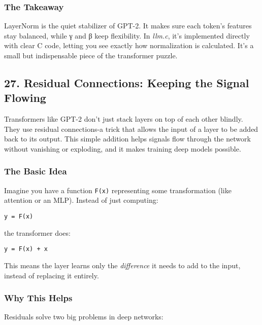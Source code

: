 \documentclass[
  letterpaper,
  DIV=11,
  numbers=noendperiod]{scrreprt}
\begin{document}
\subsubsection{The Takeaway}\label{the-takeaway-15}

LayerNorm is the quiet stabilizer of GPT-2. It makes sure each token's
features stay balanced, while γ and β keep flexibility. In \emph{llm.c},
it's implemented directly with clear C code, letting you see exactly how
normalization is calculated. It's a small but indispensable piece of the
transformer puzzle.

\subsection{27. Residual Connections: Keeping the Signal
Flowing}\label{residual-connections-keeping-the-signal-flowing}

Transformers like GPT-2 don't just stack layers on top of each other
blindly. They use residual connections-a trick that allows the input of
a layer to be added back to its output. This simple addition helps
signals flow through the network without vanishing or exploding, and it
makes training deep models possible.

\subsubsection{The Basic Idea}\label{the-basic-idea}

Imagine you have a function \texttt{F(x)} representing some
transformation (like attention or an MLP). Instead of just computing:

\begin{verbatim}
y = F(x)
\end{verbatim}

the transformer does:

\begin{verbatim}
y = F(x) + x
\end{verbatim}

This means the layer learns only the \emph{difference} it needs to add
to the input, instead of replacing it entirely.

\subsubsection{Why This Helps}\label{why-this-helps}

Residuals solve two big problems in deep networks:
\end{document}

